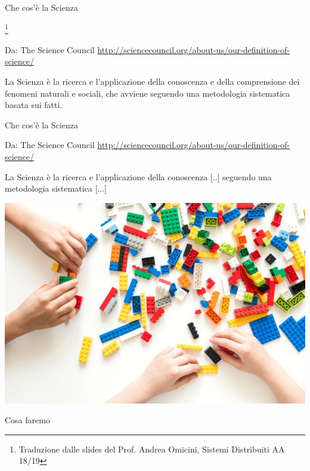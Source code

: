 \begin{frame}{Che cos'è la Scienza}
    
\footnote{Traduzione dalle slides del Prof. Andrea Omicini, Sistemi Distribuiti AA 18/19}
\begin{block}{Da: The Science Council}
\small{\url{http://sciencecouncil.org/about-us/our-definition-of-science/}}
\vspace{0.5cm}

La Scienza è la ricerca e l'applicazione della conoscenza e della comprensione dei fenomeni naturali e sociali, che avviene seguendo una metodologia sistematica basata sui fatti.
\end{block}

\end{frame}

\begin{frame}{Che cos'è la Scienza}
    
\begin{block}{Da: The Science Council}
\small{\url{http://sciencecouncil.org/about-us/our-definition-of-science/}}
\vspace{0.5cm}

La Scienza è la ricerca e l'applicazione della conoscenza [..] seguendo una metodologia sistematica [...]
\end{block}

\end{frame}

{\includegraphics[width=\paperwidth,height=\paperheight]{images/lego.jpg}}
\begin{frame}{Cosa faremo}
\end{frame}

